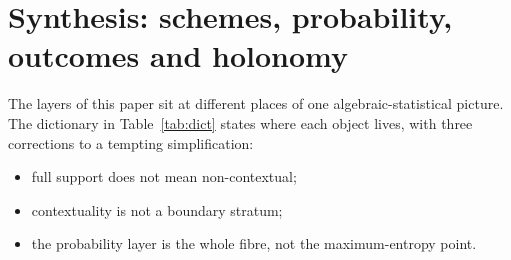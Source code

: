 \documentclass[11pt]{article}
\theoremstyle{definition}
\theoremstyle{remark}
\begin{document}
\section{Synthesis: schemes, probability, outcomes and holonomy}\label{sec:synthesis}
The layers of this paper sit at different places of one algebraic-statistical picture. The dictionary in Table~\ref{tab:dict} states where each object lives, with three corrections to a tempting simplification:
\begin{itemize}
  \item full support does not mean non-contextual;
  \item contextuality is not a boundary stratum;
  \item the probability layer is the whole fibre, not the maximum-entropy point.
\end{itemize}
\end{document}
